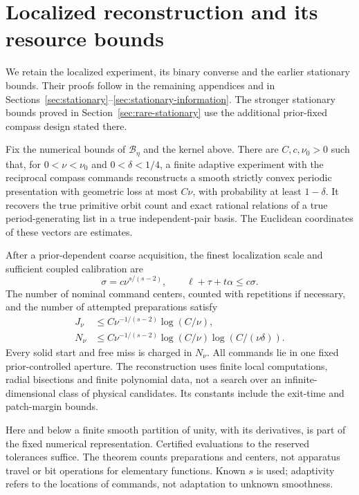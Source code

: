 \section{Localized reconstruction and its resource bounds}
\label{sec:localized-statements}
We retain the localized experiment, its binary converse and the earlier
stationary bounds. Their proofs follow in the remaining appendices and
in Sections~\ref{sec:stationary}--\ref{sec:stationary-information}.
The stronger stationary bounds proved in Section~\ref{sec:rare-stationary}
use the additional prior-fixed compass design stated there.

\begin{theorem}\label{thm:adaptive}
Fix the numerical bounds of $\mathcal B_\eta$ and the kernel above.
There are $C,c,\nu_0>0$ such that, for $0<\nu<\nu_0$ and
$0<\delta<1/4$, a finite adaptive experiment with the reciprocal
compass commands reconstructs a smooth strictly convex periodic
presentation with geometric loss at most $C\nu$, with probability at
least $1-\delta$. It recovers the true primitive orbit count and exact
rational relations of a true period-generating list in a true independent-pair basis. The Euclidean coordinates of these vectors are estimates.

After a prior-dependent coarse acquisition, the finest localization
scale and sufficient coupled calibration are
\begin{equation}\label{eq:precision}
 \sigma=c\nu^{s/(s-2)},\qquad \ell+\tau+t\alpha\le c\sigma.
\end{equation}
The number of nominal command centers, counted with repetitions if
necessary, and the number of attempted preparations satisfy
\begin{align}
 J_\nu&\le C\nu^{-1/(s-2)}\log(C/\nu),\label{eq:centers}\\
 N_\nu&\le C\nu^{-1/(s-2)}\log(C/\nu)
                               \log(C/(\nu\delta)).\label{eq:attempts}
\end{align}
Every solid start and free miss is charged in $N_\nu$. All commands lie
in one fixed prior-controlled aperture. The reconstruction uses finite
local computations, radial bisections and finite polynomial data, not
a search over an infinite-dimensional class of physical candidates.
Its constants include the exit-time and patch-margin bounds.
\end{theorem}

Here and below a finite smooth partition of unity, with its derivatives,
is part of the fixed numerical representation. Certified evaluations
to the reserved tolerances suffice. The theorem counts preparations and
centers, not apparatus travel or bit operations for elementary functions.
Known $s$ is used; adaptivity refers to the locations of commands, not
adaptation to unknown smoothness.

